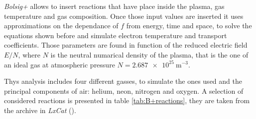 \emph{Bolsig+} allows to insert reactions that have place inside the plasma, gas temperature and gas composition. Once those input values are inserted it uses approximations on the dependance of $f$ from energy, time and space, to solve the equations shown before and simulate electron temperature and transport coefficients. Those parameters are found in function of the reduced electric field $E/N$, where $N$ is the neutral numarical density of the plasma, that is the one of an ideal gas at atmospheric pressure $N = \SI{2.687e25}{\meter^{-3}}$.

Thys analysis includes four different gasses, to simulate the ones used and the principal components of air: helium, neon, nitrogen and oxygen. A selection of considered reactions is presented in table \ref{tab:B+reactions}, they are taken from the archive in \emph{LxCat} (\cite{LxCat}).
